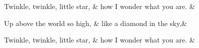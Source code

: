 \documentclass{article}
\begin{document}
\beginnumbering

\stanza[\emph{A}]
Twinkle, twinkle, little star, &
how I wonder what you are. \&

\stanza[\emph{B}]
Up above the world so high, &
like a diamond in the sky,\&

\stanza[\emph{A}]
 Twinkle, twinkle, little star,  &
 how I wonder what you are. \&

\endnumbering
\end{document}
